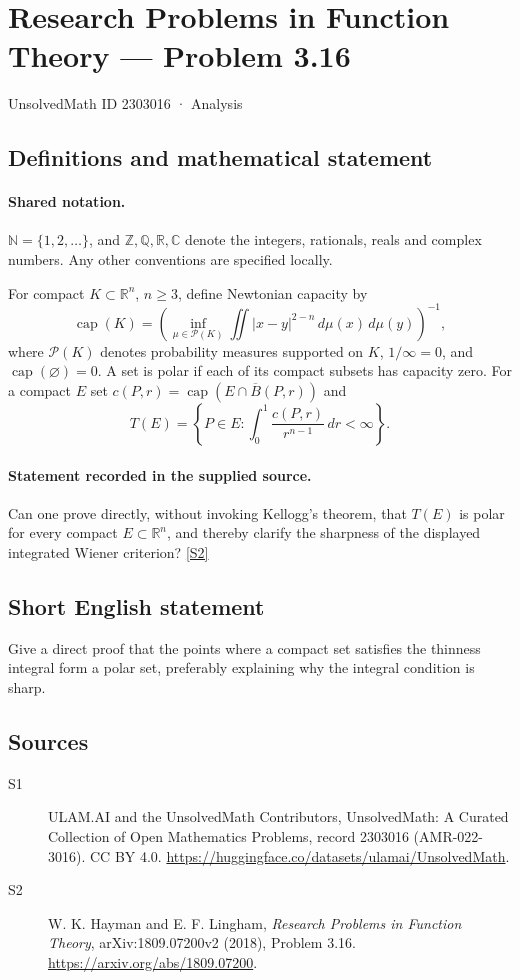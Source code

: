 \documentclass[11pt]{article}
\newcommand{\sref}[2]{\hyperlink{source:#1:#2}{[S#2]}}
\begin{document}
\setcounter{section}{2303015}
\section{Research Problems in Function Theory — Problem 3.16}\label{2303016}
{\small\sffamily UnsolvedMath ID 2303016 · Analysis}
\subsection{Definitions and mathematical statement}

\paragraph{Shared notation.}$\mathbb N=\{1,2,\ldots\}$, and $\mathbb Z,\mathbb Q,\mathbb R,\mathbb C$ denote the integers, rationals, reals and complex numbers. Any other conventions are specified locally.


For compact $K\subset\mathbb R^n$, $n\geq3$, define Newtonian capacity by
\[\operatorname{cap}(K)=\left(\inf_{\mu\in\mathcal P(K)}\iint |x-y|^{2-n}\,d\mu(x)\,d\mu(y)\right)^{-1},\]
where $\mathcal P(K)$ denotes probability measures supported on $K$, $1/\infty=0$, and $\operatorname{cap}(\varnothing)=0$. A set is polar if each of its compact subsets has capacity zero. For a compact $E$ set $c(P,r)=\operatorname{cap}(E\cap\overline B(P,r))$ and
\[T(E)=\left\{P\in E:\int_0^1\frac{c(P,r)}{r^{n-1}}\,dr<\infty\right\}.\]
\paragraph{Statement recorded in the supplied source.}
Can one prove directly, without invoking Kellogg's theorem, that $T(E)$ is polar for every compact $E\subset\mathbb R^n$, and thereby clarify the sharpness of the displayed integrated Wiener criterion? \sref{2303016}{2}
\subsection{Short English statement}
Give a direct proof that the points where a compact set satisfies the thinness integral form a polar set, preferably explaining why the integral condition is sharp.
\subsection{Sources}
\begin{description}
\item[\hypertarget{source:2303016:1}{S1}] ULAM.AI and the UnsolvedMath Contributors, UnsolvedMath: A Curated Collection of Open Mathematics Problems, record 2303016 (AMR-022-3016). CC BY 4.0. \url{https://huggingface.co/datasets/ulamai/UnsolvedMath}.
\item[\hypertarget{source:2303016:2}{S2}] W. K. Hayman and E. F. Lingham, \emph{Research Problems in Function Theory}, arXiv:1809.07200v2 (2018), Problem 3.16. \url{https://arxiv.org/abs/1809.07200}.
\end{description}
\label{end:2303016}
\end{document}
